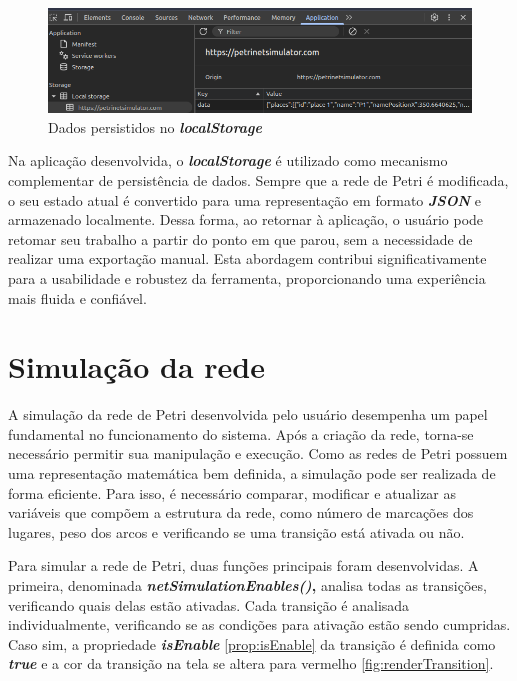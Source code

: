 \documentclass[
	12pt,				%
	openright,			%
	oneside,			%
	a4paper,			%
	english,			%
	brazil				%
	]{abntex2}
\begin{document}


\begin{figure}[ht] 
	\centering
	\includegraphics[scale=0.6]{figuras/localStorage.png}
	\caption[Dados persistidos no localStorage]{Dados persistidos no \textbf{\textit{localStorage}}}
	\label{fig:localStorage}
\end{figure}
\FloatBarrier

Na aplicação desenvolvida, o \textbf{\textit{localStorage}} é utilizado como mecanismo complementar de persistência de dados. Sempre que a rede de Petri é modificada, o seu estado atual é convertido para uma representação em formato \textbf{\textit{JSON}} e armazenado localmente. Dessa forma, ao retornar à aplicação, o usuário pode retomar seu trabalho a partir do ponto em que parou, sem a necessidade de realizar uma exportação manual. Esta abordagem contribui significativamente para a usabilidade e robustez da ferramenta, proporcionando uma experiência mais fluida e confiável. 

\section{Simulação da rede} \label{cap:simulation}

A simulação da rede de Petri desenvolvida pelo usuário desempenha um papel fundamental no funcionamento do sistema. Após a criação da rede, torna-se necessário permitir sua manipulação e execução. Como as redes de Petri possuem uma representação matemática bem definida, a simulação pode ser realizada de forma eficiente. Para isso, é necessário comparar, modificar e atualizar as variáveis que compõem a estrutura da rede, como número de marcações dos lugares, peso dos arcos e verificando se uma transição está ativada ou não. 

Para simular a rede de Petri, duas funções principais foram desenvolvidas. A primeira, denominada \textbf{\textit{netSimulationEnables()},} analisa todas as transições, verificando quais delas estão ativadas. Cada transição é analisada individualmente, verificando se as condições para ativação estão sendo cumpridas. Caso sim, a propriedade \textbf{\textit{isEnable}} \ref{prop:isEnable} da transição é definida como \textbf{\textit{true}} e a cor da transição na tela se altera para vermelho \ref{fig:renderTransition}. 
\end{document}
